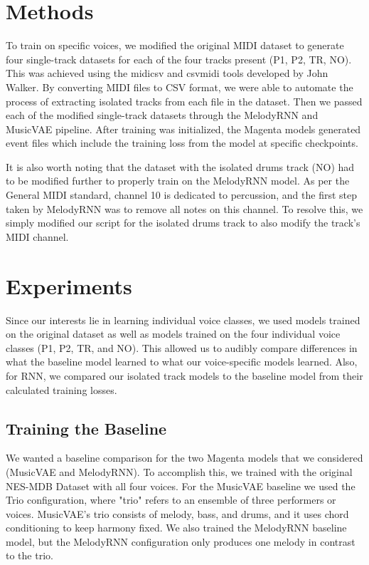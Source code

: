\documentclass{article}
\begin{document}
\section{Methods}

To train on specific voices, we modified the original MIDI dataset to generate four single-track datasets for each of the four tracks present (P1, P2, TR, NO). This was achieved using the midicsv and csvmidi tools developed by John Walker. By converting MIDI files to CSV format, we were able to automate the process of extracting isolated tracks from each file in the dataset. Then we passed each of the modified single-track datasets through the MelodyRNN and MusicVAE pipeline. After training was initialized, the Magenta models generated event files which include the training loss from the model at specific checkpoints.

It is also worth noting that the dataset with the isolated drums track (NO) had to be modified further to properly train on the MelodyRNN model. As per the General MIDI standard, channel 10 is dedicated to percussion, and the first step taken by MelodyRNN was to remove all notes on this channel. To resolve this, we simply modified our script for the isolated drums track to also modify the track’s MIDI channel.



\section{Experiments}

Since our interests lie in learning individual voice classes, we used models trained on the original dataset as well as models trained on the four individual voice classes (P1, P2, TR, and NO). This allowed us to audibly compare differences in what the baseline model learned to what our voice-specific models learned. Also, for RNN, we compared our isolated track models to the baseline model from their calculated training losses.

\subsection{Training the Baseline}
We wanted a baseline comparison for the two Magenta models that we considered (MusicVAE and MelodyRNN). To accomplish this, we trained with the original NES-MDB Dataset with all four voices. For the MusicVAE baseline we used the Trio configuration, where "trio" refers to an ensemble of three performers or voices. MusicVAE’s trio consists of melody, bass, and drums, and it uses chord conditioning to keep harmony fixed. We also trained the MelodyRNN baseline model, but the MelodyRNN configuration only produces one melody in contrast to the trio.
\end{document}
